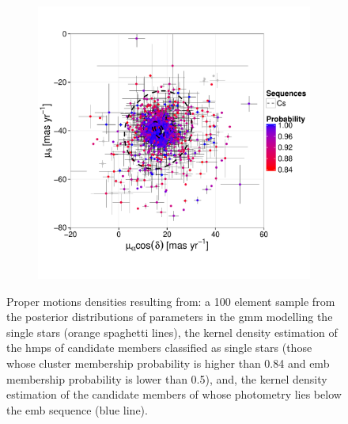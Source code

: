\begin{figure}[ht!]
\begin{subfigure}[t]{0.45\textwidth}
     \includegraphics[page=3,width=\textwidth]{background/Figures/BHM/Cs_members.pdf}
        \caption{}
    \end{subfigure}
\caption{Proper motions densities resulting from: a 100 element sample from the posterior distributions of parameters in the \gls{gmm} modelling the single stars (orange spaghetti lines), the kernel density estimation of the \gls{hmps} of candidate members classified as single stars (those whose cluster membership probability is higher than 0.84 and \gls{emb} membership probability is lower than 0.5), and, the kernel density estimation of the candidate members of \citet{Bouy2015} whose photometry lies below the \gls{emb} sequence (blue line).}
\label{fig:PMCs}
\end{figure}

